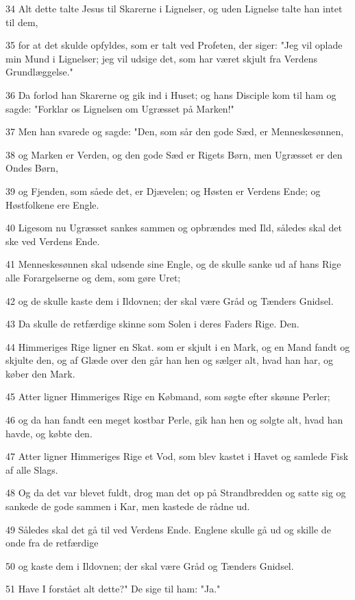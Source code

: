 \par 34 Alt dette talte Jesus til Skarerne i Lignelser, og uden Lignelse talte han intet til dem,
\par 35 for at det skulde opfyldes, som er talt ved Profeten, der siger: "Jeg vil oplade min Mund i Lignelser; jeg vil udsige det, som har været skjult fra Verdens Grundlæggelse."
\par 36 Da forlod han Skarerne og gik ind i Huset; og hans Disciple kom til ham og sagde: "Forklar os Lignelsen om Ugræsset på Marken!"
\par 37 Men han svarede og sagde: "Den, som sår den gode Sæd, er Menneskesønnen,
\par 38 og Marken er Verden, og den gode Sæd er Rigets Børn, men Ugræsset er den Ondes Børn,
\par 39 og Fjenden, som såede det, er Djævelen; og Høsten er Verdens Ende; og Høstfolkene ere Engle.
\par 40 Ligesom nu Ugræsset sankes sammen og opbrændes med Ild, således skal det ske ved Verdens Ende.
\par 41 Menneskesønnen skal udsende sine Engle, og de skulle sanke ud af hans Rige alle Forargelserne og dem, som gøre Uret;
\par 42 og de skulle kaste dem i Ildovnen; der skal være Gråd og Tænders Gnidsel.
\par 43 Da skulle de retfærdige skinne som Solen i deres Faders Rige. Den.
\par 44 Himmeriges Rige ligner en Skat. som er skjult i en Mark, og en Mand fandt og skjulte den, og af Glæde over den går han hen og sælger alt, hvad han har, og køber den Mark.
\par 45 Atter ligner Himmeriges Rige en Købmand, som søgte efter skønne Perler;
\par 46 og da han fandt een meget kostbar Perle, gik han hen og solgte alt, hvad han havde, og købte den.
\par 47 Atter ligner Himmeriges Rige et Vod, som blev kastet i Havet og samlede Fisk af alle Slags.
\par 48 Og da det var blevet fuldt, drog man det op på Strandbredden og satte sig og sankede de gode sammen i Kar, men kastede de rådne ud.
\par 49 Således skal det gå til ved Verdens Ende. Englene skulle gå ud og skille de onde fra de retfærdige
\par 50 og kaste dem i Ildovnen; der skal være Gråd og Tænders Gnidsel.
\par 51 Have I forstået alt dette?" De sige til ham: "Ja."
